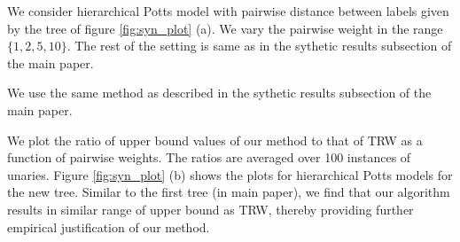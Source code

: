{{{{
  We consider hierarchical Potts model with pairwise distance between labels given by the tree of figure \ref{fig:syn_plot} (a). We vary the pairwise weight in the range $\{1, 2, 5, 10\}$. The rest of the setting is same as in the sythetic results subsection of the main paper.

 We use the same method as described in the sythetic results subsection of the main paper. 

 We plot the ratio of upper bound values of our method to that of TRW as a function of pairwise weights. The ratios are averaged over 100 instances of unaries. Figure \ref{fig:syn_plot} (b) shows the plots for hierarchical Potts models for the new tree. Similar to the first tree (in main paper), we find that our algorithm results in similar range of upper bound as TRW, thereby providing further empirical justification of our method.

}}}}
